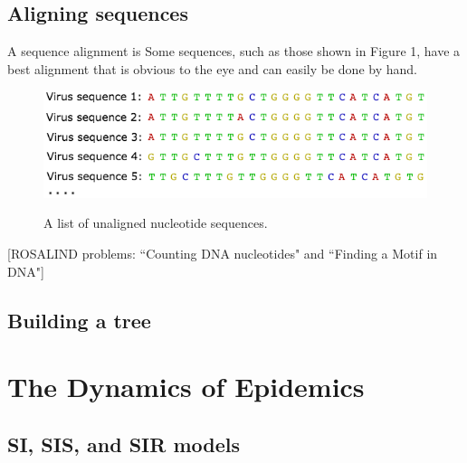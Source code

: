 \documentclass{scrartcl}
\begin{document}


\subsection{Aligning sequences}

A sequence alignment is
Some sequences, such as those shown in Figure 1, have a best alignment that is obvious to the eye and can easily be done by hand.

\begin{figure}[H] 
\center
{\includegraphics[width=0.7\linewidth]{FluSequence0.png}}
\caption{A list of unaligned nucleotide sequences.}
\label{sequences}
\end{figure}

\vspace{2mm}

\vspace{2mm}

\vspace{2mm}
[ROSALIND problems:  ``Counting DNA nucleotides" and ``Finding a Motif in DNA"]

\subsection{Building a tree}



\section{The Dynamics of Epidemics}

\subsection{SI, SIS, and SIR models}
\end{document}
